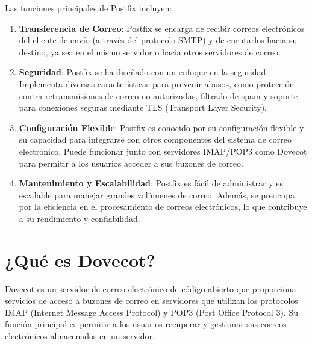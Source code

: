 \documentclass{article}
\begin{document}
Las funciones principales de Postfix incluyen:\\
\begin{enumerate}
\item \textbf{Transferencia de Correo}: Postfix se encarga de recibir correos electrónicos del cliente de envío (a través del protocolo SMTP) y de enrutarlos hacia su destino, ya sea en el mismo servidor o hacia otros servidores de correo.
\item \textbf{Seguridad}: Postfix se ha diseñado con un enfoque en la seguridad. Implementa diversas características para prevenir abusos, como protección contra retransmisiones de correo no autorizadas, filtrado de spam y soporte para conexiones seguras mediante TLS (Transport Layer Security).
\item \textbf{Configuración Flexible}: Postfix es conocido por su configuración flexible y su capacidad para integrarse con otros componentes del sistema de correo electrónico. Puede funcionar junto con servidores IMAP/POP3 como Dovecot para permitir a los usuarios acceder a sus buzones de correo.
\item \textbf{Mantenimiento y Escalabilidad}: Postfix es fácil de administrar y es escalable para manejar grandes volúmenes de correo. Además, se preocupa por la eficiencia en el procesamiento de correos electrónicos, lo que contribuye a su rendimiento y confiabilidad.
\end{enumerate}

\section{¿Qué es Dovecot?}
Dovecot es un servidor de correo electrónico de código abierto que proporciona servicios de acceso a buzones de correo en servidores que utilizan los protocolos IMAP (Internet Message Access Protocol) y POP3 (Post Office Protocol 3). Su función principal es permitir a los usuarios recuperar y gestionar sus correos electrónicos almacenados en un servidor.\\
\end{document}
